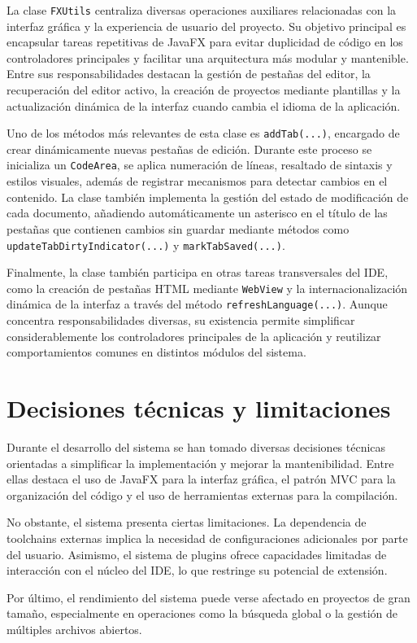 \documentclass[../../main.tex]{subfiles}
\begin{document}
La clase \lstinline|FXUtils| centraliza diversas operaciones auxiliares relacionadas con la interfaz gráfica y la experiencia de usuario del proyecto. Su objetivo principal es encapsular tareas repetitivas de JavaFX para evitar duplicidad de código en los controladores principales y facilitar una arquitectura más modular y mantenible. Entre sus responsabilidades destacan la gestión de pestañas del editor, la recuperación del editor activo, la creación de proyectos mediante plantillas y la actualización dinámica de la interfaz cuando cambia el idioma de la aplicación.

Uno de los métodos más relevantes de esta clase es \lstinline|addTab(...)|, encargado de crear dinámicamente nuevas pestañas de edición. Durante este proceso se inicializa un \lstinline|CodeArea|, se aplica numeración de líneas, resaltado de sintaxis y estilos visuales, además de registrar mecanismos para detectar cambios en el contenido. La clase también implementa la gestión del estado de modificación de cada documento, añadiendo automáticamente un asterisco en el título de las pestañas que contienen cambios sin guardar mediante métodos como \lstinline|updateTabDirtyIndicator(...)| y \lstinline|markTabSaved(...)|.

Finalmente, la clase también participa en otras tareas transversales del IDE, como la creación de pestañas HTML mediante \lstinline|WebView| y la internacionalización dinámica de la interfaz a través del método \lstinline|refreshLanguage(...)|. Aunque concentra responsabilidades diversas, su existencia permite simplificar considerablemente los controladores principales de la aplicación y reutilizar comportamientos comunes en distintos módulos del sistema.

\clearpage

\section{Decisiones técnicas y limitaciones}

Durante el desarrollo del sistema se han tomado diversas decisiones técnicas orientadas a simplificar la implementación y mejorar la mantenibilidad. Entre ellas destaca el uso de JavaFX para la interfaz gráfica, el patrón MVC para la organización del código y el uso de herramientas externas para la compilación.

No obstante, el sistema presenta ciertas limitaciones. La dependencia de toolchains externas implica la necesidad de configuraciones adicionales por parte del usuario. Asimismo, el sistema de plugins ofrece capacidades limitadas de interacción con el núcleo del IDE, lo que restringe su potencial de extensión.

Por último, el rendimiento del sistema puede verse afectado en proyectos de gran tamaño, especialmente en operaciones como la búsqueda global o la gestión de múltiples archivos abiertos.
\end{document}
